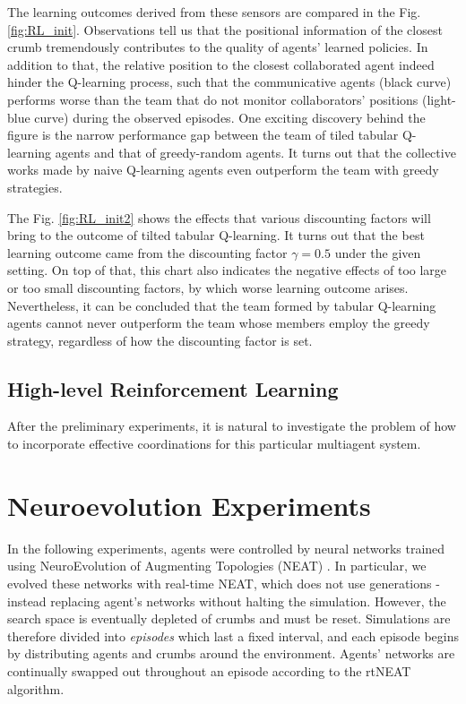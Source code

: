\documentclass[conference]{IEEEtran}
\begin{document}
The learning outcomes derived from these sensors are compared in the
Fig. \ref{fig:RL_init}. 
Observations tell us that the positional information of the closest crumb
tremendously contributes to the quality of agents' learned policies. 
In addition to that, the relative position to the closest collaborated agent
indeed hinder the Q-learning process, such that the communicative agents (black
curve) performs worse than the team that do not monitor collaborators'
positions (light-blue curve) during the observed episodes. One exciting
discovery behind the figure is the narrow performance gap between the team of
tiled tabular Q-learning agents and that of greedy-random agents. It turns out
that the collective works made by naive Q-learning agents even outperform the
team with greedy strategies.



The Fig. \ref{fig:RL_init2} shows the effects that various discounting factors
will bring to the outcome of tilted tabular Q-learning. It turns out that the
best learning outcome came from the discounting factor $\gamma = 0.5$ under
the given setting. On top of that, this chart also indicates the negative
effects of too large or too small discounting factors, by which worse learning
outcome arises. Nevertheless, it can be concluded that the team formed by
tabular Q-learning agents cannot never outperform the team whose members
employ the greedy strategy, regardless of how the discounting factor is set.

\subsection{High-level Reinforcement Learning}
After the preliminary experiments, it is natural to investigate the problem of how
to incorporate effective coordinations for this particular multiagent system.



\section{Neuroevolution Experiments}
\label{section:neuro}

In the following experiments, agents were controlled by neural networks
trained using NeuroEvolution of Augmenting Topologies (NEAT) \cite{stanley2002evolving}.
In particular, we evolved these networks with real-time NEAT, which does not use generations - instead replacing agent's networks without halting the simulation. However, the search space is eventually depleted of crumbs and must be reset. Simulations are therefore divided into \textit{episodes} which last a fixed interval, and  each episode begins by distributing agents and crumbs around the environment. Agents' networks are continually swapped out throughout an episode according to the rtNEAT algorithm.
\end{document}
